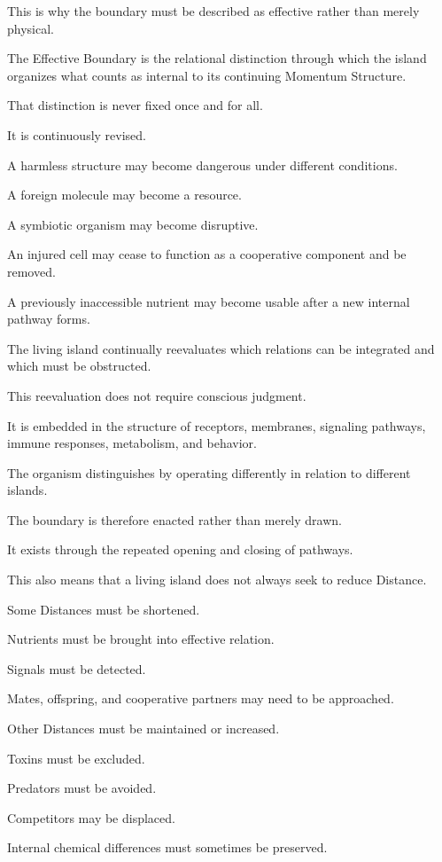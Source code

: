 This is why the boundary must be described as effective rather than merely physical.

The Effective Boundary is the relational distinction through which the island organizes what counts as internal to its continuing Momentum Structure.

That distinction is never fixed once and for all.

It is continuously revised.

A harmless structure may become dangerous under different conditions.

A foreign molecule may become a resource.

A symbiotic organism may become disruptive.

An injured cell may cease to function as a cooperative component and be removed.

A previously inaccessible nutrient may become usable after a new internal pathway forms.

The living island continually reevaluates which relations can be integrated and which must be obstructed.

This reevaluation does not require conscious judgment.

It is embedded in the structure of receptors, membranes, signaling pathways, immune responses, metabolism, and behavior.

The organism distinguishes by operating differently in relation to different islands.

The boundary is therefore enacted rather than merely drawn.

It exists through the repeated opening and closing of pathways.

This also means that a living island does not always seek to reduce Distance.

Some Distances must be shortened.

Nutrients must be brought into effective relation.

Signals must be detected.

Mates, offspring, and cooperative partners may need to be approached.

Other Distances must be maintained or increased.

Toxins must be excluded.

Predators must be avoided.

Competitors may be displaced.

Internal chemical differences must sometimes be preserved.

